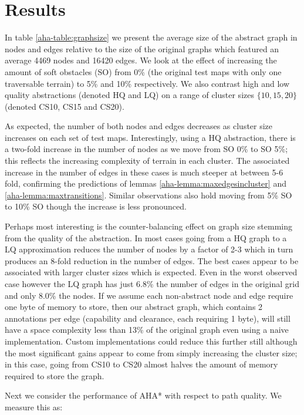 \section{Results}
In table \ref{aha-table:graphsize} we present the average size of the abstract graph in nodes and edges relative to the size of the original graphs which featured an average 4469 nodes and 16420 edges. 
We look at the effect of increasing the amount of soft obstacles (SO) from 0\% (the original test maps with only one traversable terrain) to 5\% and 10\% respectively. 
We also contrast high and low quality abstractions (denoted HQ and LQ) on a range of cluster sizes $\lbrace 10, 15, 20 \rbrace$ (denoted CS10, CS15 and CS20).

As expected, the number of both nodes and edges decreases as cluster size increases on each set of test maps. 
Interestingly, using a HQ abstraction, there is a two-fold increase in the number of nodes as we move from SO 0\% to SO 5\%; this reflects the increasing complexity of terrain in each cluster. 
The associated increase in the number of edges in these cases is much steeper at between 5-6 fold, confirming the predictions of lemmas \ref{aha-lemma:maxedgesincluster} and \ref{aha-lemma:maxtransitions}. 
Similar observations also hold moving from 5\% SO to 10\% SO though the increase is less pronounced.
\par \indent
Perhaps most interesting is the counter-balancing effect on graph size stemming from the quality of the abstraction. 
In most cases going from a HQ graph to a LQ approximation reduces the number of nodes by a factor of 2-3 which in turn produces an 8-fold reduction in the number of edges.
The best cases appear to be associated with larger cluster sizes which is expected. 
Even in the worst observed case however the LQ graph has just 6.8\% the number of edges in the original grid and only 8.0\% the nodes. 
If we assume each non-abstract node and edge require one byte of memory to store, then our abstract graph, which contains 2 annotations per edge (capability and clearance, each requiring 1 byte), will still have a space complexity less than 13\% of the original graph even using a naive implementation. 
Custom implementations could reduce this further still although the most significant gains appear to come from simply increasing the cluster size; in this case, going from CS10 to CS20 almost halves the amount of memory required to store the graph.
\par \indent
Next we consider the performance of AHA* with respect to path quality. We measure this as:
